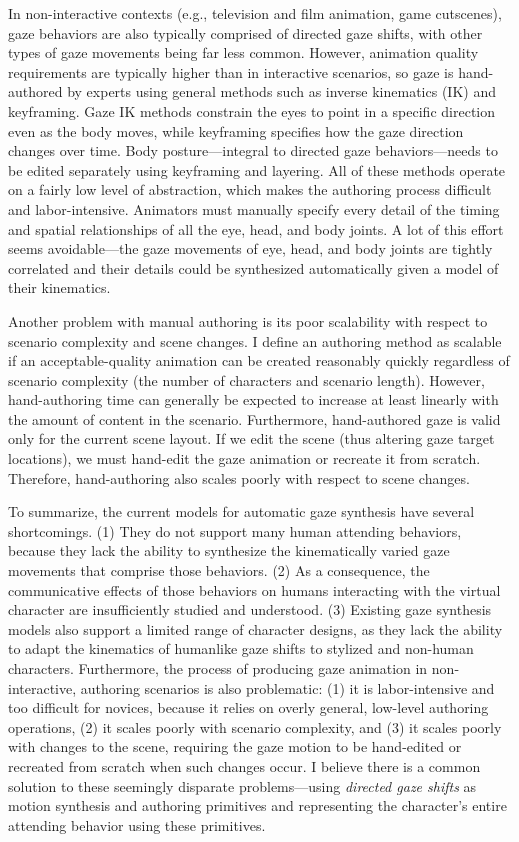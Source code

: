 In non-interactive contexts (e.g., television and film animation, game cutscenes), gaze behaviors are also typically comprised of directed gaze shifts, with other types of gaze movements being far less common. However, animation quality requirements are typically higher than in interactive scenarios, so gaze is hand-authored by experts using general methods such as inverse kinematics (IK) and keyframing. Gaze IK methods constrain the eyes to point in a specific direction even as the body moves, while keyframing specifies how the gaze direction changes over time. Body posture---integral to directed gaze behaviors---needs to be edited separately using keyframing and layering. All of these methods operate on a fairly low level of abstraction, which makes the authoring process difficult and labor-intensive. Animators must manually specify every detail of the timing and spatial relationships of all the eye, head, and body joints. A lot of this effort seems avoidable---the gaze movements of eye, head, and body joints are tightly correlated and their details could be synthesized automatically given a model of their kinematics.

Another problem with manual authoring is its poor scalability with respect to scenario complexity and scene changes. I define an authoring method as scalable if an acceptable-quality animation can be created reasonably quickly regardless of scenario complexity (the number of characters and scenario length). However, hand-authoring time can generally be expected to increase at least linearly with the amount of content in the scenario. Furthermore, hand-authored gaze is valid only for the current scene layout. If we edit the scene (thus altering gaze target locations), we must hand-edit the gaze animation or recreate it from scratch. Therefore, hand-authoring also scales poorly with respect to scene changes.

To summarize, the current models for automatic gaze synthesis have several shortcomings. (1) They do not support many human attending behaviors, because they lack the ability to synthesize the kinematically varied gaze movements that comprise those behaviors. (2) As a consequence, the communicative effects of those behaviors on humans interacting with the virtual character are insufficiently studied and understood. (3) Existing gaze synthesis models also support a limited range of character designs, as they lack the ability to adapt the kinematics of humanlike gaze shifts to stylized and non-human characters.
Furthermore, the process of producing gaze animation in non-interactive, authoring scenarios is also problematic: (1) it is labor-intensive and too difficult for novices, because it relies on overly general, low-level authoring operations, (2) it scales poorly with scenario complexity, and (3) it scales poorly with changes to the scene, requiring the gaze motion to be hand-edited or recreated from scratch when such changes occur.
I believe there is a common solution to these seemingly disparate problems---using \emph{directed gaze shifts} as motion synthesis and authoring primitives and representing the character's entire attending behavior using these primitives.

